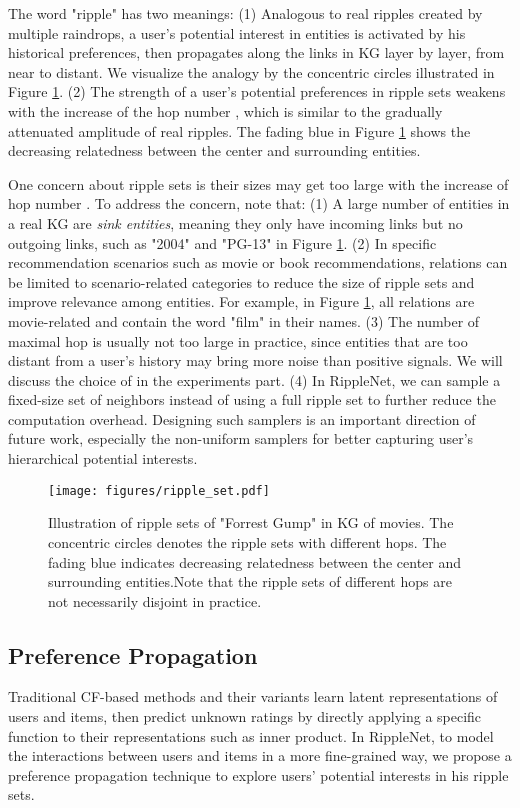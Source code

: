 \documentclass[sigconf]{acmart}
\begin{document}
		The word "ripple" has two meanings:
		(1) Analogous to real ripples created by multiple raindrops, a user's potential interest in entities is activated by his historical preferences, then propagates along the links in KG layer by layer, from near to distant.
		We visualize the analogy by the concentric circles illustrated in Figure \ref{fig:ripple_set}.
		(2) The strength of a user's potential preferences in ripple sets weakens with the increase of the hop number , which is similar to the gradually attenuated amplitude of real ripples.
		The fading blue in Figure \ref{fig:ripple_set} shows the decreasing relatedness between the center and surrounding entities.
		
		One concern about ripple sets is their sizes may get too large with the increase of hop number .
		To address the concern, note that:
		(1) A large number of entities in a real KG are \textit{sink entities}, meaning they only have incoming links but no outgoing links, such as "2004" and "PG-13" in Figure \ref{fig:ripple_set}.
		(2) In specific recommendation scenarios such as movie or book recommendations, relations can be limited to scenario-related categories to reduce the size of ripple sets and improve relevance among entities.
		For example, in Figure \ref{fig:ripple_set}, all relations are movie-related and contain the word "film" in their names.
		(3) The number of maximal hop  is usually not too large in practice, since entities that are too distant from a user's history may bring more noise than positive signals.
		We will discuss the choice of  in the experiments part.
		(4) In RippleNet, we can sample a fixed-size set of neighbors instead of using a full ripple set to further reduce the computation overhead.
		Designing such samplers is an important direction of future work, especially the non-uniform samplers for better capturing user's hierarchical potential interests.
		
		\begin{figure}[t]
			\centering
  			\texttt{[image: figures/ripple\_set.pdf]}
  			\caption{Illustration of ripple sets of "Forrest Gump" in KG of movies. The concentric circles denotes the ripple sets with different hops. The fading blue indicates decreasing relatedness between the center and surrounding entities.Note that the ripple sets of different hops are not necessarily disjoint in practice.}
  			\label{fig:ripple_set}
		\end{figure}
		
		
	\subsection{Preference Propagation}
Traditional CF-based methods and their variants \cite{koren2008factorization,wang2017joint} learn latent representations of users and items, then predict unknown ratings by directly applying a specific function to their representations such as inner product.
		In RippleNet, to model the interactions between users and items in a more fine-grained way, we propose a preference propagation technique to explore users' potential interests in his ripple sets.
		
\end{document}
